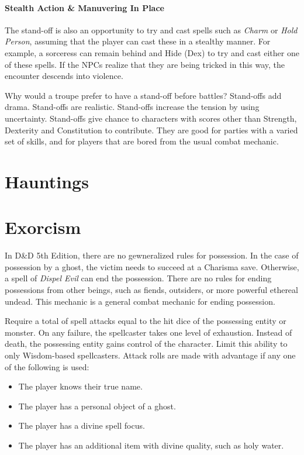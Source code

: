 \documentclass[twocolumn]{dndbook}
\begin{document}
\paragraph*{Stealth Action \& Manuvering In Place}
The stand-off is also an opportunity to try and cast spells such as \emph{Charm} or \emph{Hold Person}, assuming that the player can cast these in a stealthy manner.
For example, a sorceress can remain behind and Hide (Dex) to try and cast either one of these spells.
If the NPCs realize that they are being tricked in this way, the encounter descends into violence.\par

\begin{emphasisParagraph}
	Why would a troupe prefer to have a stand-off before battles?
	Stand-offs add drama. Stand-offs are realistic.
	Stand-offs increase the tension by using uncertainty.
	Stand-offs give chance to characters with scores other than Strength, Dexterity and Constitution to contribute.
	They are good for parties with a varied set of skills, and for players that are bored from the usual combat mechanic.\par
\end{emphasisParagraph}

\section{Hauntings}

\section{Exorcism}

In D\&D 5th Edition, there are no gewneralized rules for possession.
In the case of possession by a ghost, the victim needs to succeed at a Charisma save.
Otherwise, a spell of \emph{Dispel Evil} can end the possession.
There are no rules for ending possessions from other beings, such as fiends, outsiders, or more powerful ethereal undead.
This mechanic is a general combat mechanic for ending possession.\par


Require a total of spell attacks equal to the hit dice of the possessing entity or monster.
On any failure, the spellcaster takes one level of exhaustion. Instead of death, the possessing entity gains control of the character.
Limit this ability to only Wisdom-based spellcasters. %
Attack rolls are made with advantage if any one of the following is used:
\begin{itemize}
	\item The player knows their true name.
	\item The player has a personal object of a ghost.
	\item The player has a divine spell focus.
	\item The player has an additional item with divine quality, such as holy water.
\end{itemize}
\end{document}

